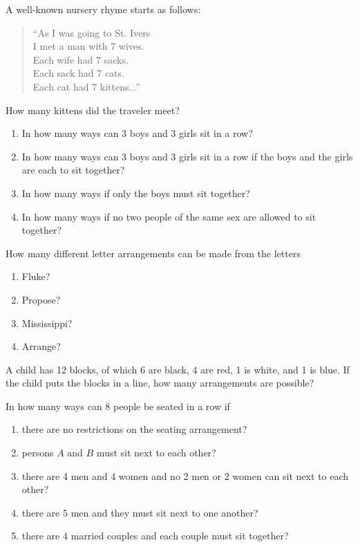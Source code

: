 \documentclass[12pt]{article}
\newenvironment{problem}[2][Problem]{\begin{trivlist}
\item[\hskip \labelsep {\bfseries #1}\hskip \labelsep {\bfseries #2.}]}{\end{trivlist}}
\begin{document}
\begin{problem}{1.6}
A well-known nursery rhyme starts as follows:
\begin{quote}
``As I was going to St. Ivers \\
I met a man with 7 wives. \\
Each wife had 7 sacks. \\
Each sack had 7 cats. \\
Each cat had 7 kittens...''\\
\end{quote}
How many kittens did the traveler meet?
\end{problem}


\begin{problem}{1.7}
\begin{enumerate}[label=(\alph*)]
	\item In how many ways can 3 boys and 3 girls sit in a row?
	\item In how many ways can 3 boys and 3 girls sit in a row if the boys and the girls are each to sit together?
	\item In how many ways if only the boys must sit together?
	\item In how many ways if no two people of the same sex are allowed to sit together?
\end{enumerate}
\end{problem}


\begin{problem}{1.8}
How many different letter arrangements can be made from the letters
\begin{enumerate}[label=(\alph*)]
	\item Fluke?
	\item Propose?
	\item Mississippi?
	\item Arrange?
\end{enumerate}
\end{problem}


\begin{problem}{1.9}
A child has 12 blocks, of which 6 are black, 4 are red, 1 is white, and 1 is blue. If the child puts the blocks in a line, how many arrangements are possible?
\end{problem}


\begin{problem}{1.10}
In how many ways can 8 people be seated in a row if
\begin{enumerate}[label=(\alph*)]
	\item there are no restrictions on the seating arrangement?
	\item persons $A$ and $B$ must sit next to each other?
	\item there are 4 men and 4 women and no 2 men or 2 women can sit next to each other?
	\item there are 5 men and they must sit next to one another?
	\item there are 4 married couples and each couple must sit together?
\end{enumerate}
\end{problem}
\end{document}
